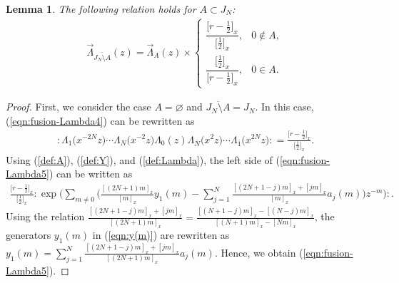 \documentclass[pdftex]{sigma}
\numberwithin{equation}{section}
\newtheorem{Lemma}[Theorem]{Lemma}
\begin{document}
\begin{Lemma}
The following relation holds for $A \subset J_N$:
\begin{gather}
\overrightarrow{\Lambda}_{\overline{J_N \setminus A}}(z)=
\overrightarrow{\Lambda}_{A}(z)\times
\begin{cases}
\dfrac{\big[r-\frac{1}{2}\big]_x}{\big[\frac{1}{2}\big]_x},& 0 \notin A,
\\[2.5ex]
\dfrac{\big[\frac{1}{2}\big]_x}{\big[r-\frac{1}{2}\big]_x},& 0 \in A.
\end{cases}
\label{eqn:fusion-Lambda4}
\end{gather}
\end{Lemma}
\begin{proof}
First, we {consider} the case $A=\varnothing$ and $\overline{J_N \setminus A}=J_N$.
In this case, (\ref{eqn:fusion-Lambda4}) {can be} rewritten as
\begin{gather}
{:}\Lambda_1\big(x^{-2N}z\big)\cdots \Lambda_{N}\big(x^{-2}z\big)
\Lambda_0(z)\Lambda_{\overline{N}}\big(x^2z\big)\cdots
\Lambda_{\overline{1}}\big(x^{2N}z\big){:}=\frac{\big[r-\frac{1}{2}\big]_x}{\big[\frac{1}{2}\big]_x}.
\label{eqn:fusion-Lambda5}
\end{gather}
Using (\ref{def:A}), (\ref{def:Y}), and (\ref{def:Lambda}),
the left side of (\ref{eqn:fusion-Lambda5}) can be written as
\begin{gather*}
\frac{\big[r-\frac{1}{2}\big]_x}{\big[\frac{1}{2}\big]_x}{:}\exp\Bigg(\sum_{m \neq 0}
\Bigg(\frac{[(2N+1)m]_x}{[m]_x}y_1(m)-\sum_{j=1}^N
\frac{[(2N+1-j)m]_x+[jm]_x}{[m]_x}a_j(m)\Bigg)z^{-m}\Bigg){:}.
\end{gather*}
Using the relation ${\frac{[(2N+1-j)m]_x+[jm]_x}{[(2N+1)m]_x}=
\frac{[(N+1-j)m]_x-[(N-j)m]_x}{[(N+1)m]_x-[Nm]_x}}$,
the generators $y_1(m)$ in (\ref{eqn:y(m)}) are rewritten as
${y_1(m)=\sum_{j=1}^N
\frac{[(2N+1-j)m]_x+[jm]_x}{[(2N+1)m]_x}a_j(m)}$.
Hence, we obtain (\ref{eqn:fusion-Lambda5}).


\end{proof}
\end{document}

